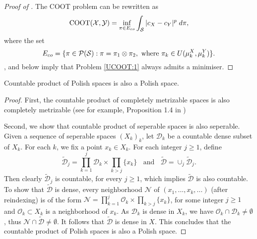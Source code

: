 \begin{proof}[Proof of ]
    The COOT problem can be rewritten as
    \begin{equation} \label{UCOOT:1}
      \text{COOT}(\mathcal X, \mathcal Y) = \inf_{\pi \in E_{co}} \int_{\mathcal S} \vert c_X - c_Y \vert^p \; d\pi,
    \end{equation}
    where the set
    \begin{equation}
      E_{co} = \{ \pi \in \mathcal P(\mathcal S): \pi = \pi_1 \otimes \pi_2,
      \text{ where } \pi_k \in U(\mu_k^X, \mu_k^Y) \}.
    \end{equation}
    ,  and 
    below imply that Problem \ref{UCOOT:1} always admits a minimiser.
  \end{proof}
  \begin{lemma} \label{product_polish}
    Countable product of Polish spaces is also a Polish space.
  \end{lemma}
  \begin{proof}
    First, the countable product of completely metrizable spaces is also completely metrizable
    (see for example, Proposition 1.4 in \citep{Dominique20})

    Second, we show that countable product of seperable spaces is also seperable.
    Given a sequence of seperable spaces $(X_k)_k$,
    let $\mathcal D_k$ be a countable dense subset of $X_k$. For each $k$,
    we fix a point $x_k \in X_k$. For each integer $j \geq 1$, define
    \begin{equation}
      \widetilde{\mathcal D}_j = \prod_{k=1}^j \mathcal D_k \times \prod_{k > j} \{ x_k \}
      \;\; \text{ and } \;\;
      \widetilde{\mathcal D} = \cup_{j} \widetilde{\mathcal D}_j.
    \end{equation}
    Then clearly $\widetilde{\mathcal D}_j$ is countable, for every $j \geq 1$,
    which implies $\widetilde{\mathcal D}$ is also countable.
    To show that $\widetilde{\mathcal D}$ is dense, every neighborhood $\mathcal N$ of
    $(x_1, ..., x_k, ...)$ (after reindexing) is of the form
    $\mathcal N = \prod_{k=1}^j \mathcal O_k \times \prod_{k > j} \{ x_k \}$,
    for some integer $j \geq 1$ and $\mathcal O_k \subset X_k$ is a neighborhood of $x_k$.
    As $\mathcal D_k$ is dense in $X_k$, we have $\mathcal O_k \cap \mathcal D_k \neq \emptyset$,
    thus $\mathcal N \cap \widetilde{\mathcal D} \neq \emptyset$.
    It follows that $\widetilde{\mathcal D}$ is dense in $X$.
    This concludes that the countable product of Polish spaces is also a Polish space.
  \end{proof}
